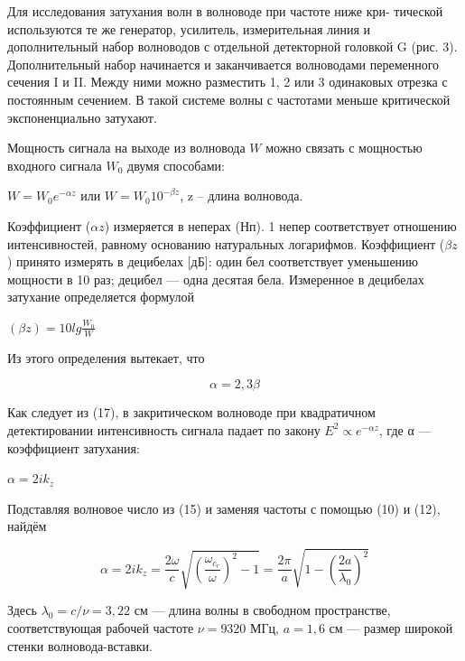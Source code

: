 \documentclass[a4paper]{article}
\begin{document}
Для исследования затухания волн в волноводе при частоте ниже кри-
тической используются те же генератор, усилитель, измерительная линия
и дополнительный набор волноводов с отдельной детекторной головкой G (рис. 3). Дополнительный набор начинается и заканчивается волноводами переменного сечения I и II. Между ними можно разместить 1, 2 или 3 одинаковых отрезка с постоянным сечением. В такой системе волны
с частотами меньше критической экспоненциально затухают. \par
Мощность сигнала на выходе из волновода $W$ можно связать с мощностью входного сигнала $W_0$ двумя способами:

\begin{center}
    $W = W_0 e^{-\alpha z}$ или $ W = W_0 10^{-\beta z}$, z -- длина волновода.
\end{center}
 Коэффициент ($\alpha z$) измеряется в неперах (Нп). 1 непер соответствует отношению интенсивностей, равному основанию натуральных логарифмов. Коэффициент ($\beta z$) принято измерять в децибелах [дБ]: один бел соответствует уменьшению мощности в 10 раз; децибел — одна десятая бела. Измеренное в децибелах затухание определяется формулой

\begin{center}
   $ (\beta z) = 10 lg\frac{W_0}{W}$
\end{center}

Из этого определения вытекает, что

\begin{equation}
    \alpha = 2,3 \beta
\end{equation}

Как следует из (17), в закритическом волноводе при квадратичном детектировании интенсивность сигнала падает по закону $E^2 \propto e^{-\alpha z}$, где α — коэффициент затухания:

\begin{center}
    $\alpha = 2ik_z$
\end{center}

Подставляя волновое число из (15) и заменяя частоты с помощью (10) и (12), найдём

\begin{equation}
    \alpha = 2ik_z = \frac{2\omega}{c} \sqrt{(\frac{\omega_c_r}{\omega})^2 - 1} = \frac{2\pi}{a}\sqrt{1 - (\frac{2a}{\lambda_0})^2}
\end{equation}

Здесь $\lambda_0 = c/\nu = 3,22$ см — длина волны в свободном пространстве, соответствующая рабочей частоте $\nu = 9320$ МГц, $a = 1,6$ см — размер
широкой стенки волновода-вставки.
\end{document}
